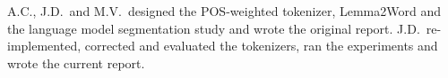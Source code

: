 A.C., J.D.\ and M.V.\ designed the POS-weighted tokenizer, Lemma2Word and the language model segmentation study and wrote the original report.
J.D.\ re-implemented, corrected and evaluated the tokenizers, ran the experiments and wrote the current report.
